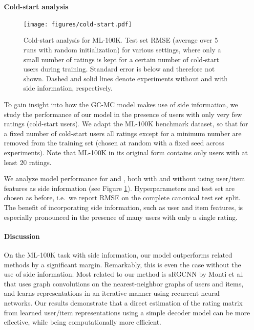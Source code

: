 \documentclass[twoside]{article}
\begin{document}
\paragraph{Cold-start analysis}
\begin{figure}[t!]
    \centering
    \texttt{[image: figures/cold-start.pdf]}
    \caption{Cold-start analysis for ML-100K. Test set RMSE (average over 5 runs with random initialization) for various settings, where only a small number of ratings  is kept for a certain number of cold-start users  during training. Standard error is below  and therefore not shown. Dashed and solid lines denote experiments without and with side information, respectively.}
    \label{fig:cold-start}
\end{figure}
To gain insight into how the GC-MC model makes use of side information, we study the performance of our model in the presence of users with only very few ratings (cold-start users). We adapt the ML-100K benchmark dataset, so that for a fixed number of cold-start users  all ratings except for a minimum number  are removed from the training set (chosen at random with a fixed seed across experiments). Note that ML-100K in its original form contains only users with at least 20 ratings.

We analyze model performance for  and , both with and without using user/item features as side information (see Figure \ref{fig:cold-start}). Hyperparameters and test set are chosen as before, i.e.~we report RMSE on the complete canonical test set split. The benefit of incorporating side information, such as user and item features, is especially pronounced in the presence of many users with only a single rating.

\paragraph{Discussion}
On the ML-100K task with side information, our model outperforms related methods by a significant margin. Remarkably, this is even the case without the use of side information. Most related to our method is sRGCNN by Monti et al.~\cite{2017_Monti_arXiv} that uses graph convolutions on the nearest-neighbor graphs of users and items, and learns representations in an iterative manner using recurrent neural networks. Our results demonstrate that a direct estimation of the rating matrix from learned user/item representations using a simple decoder model can be more effective, while being computationally more efficient.
\end{document}
